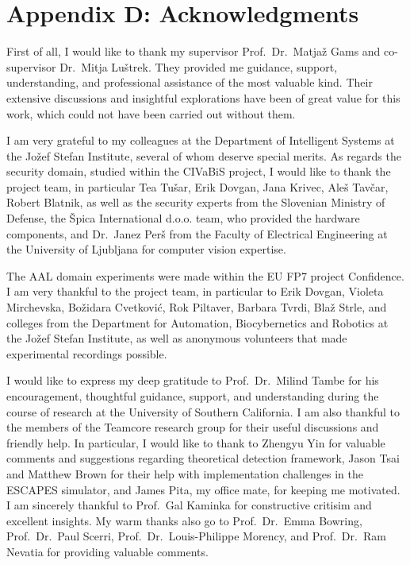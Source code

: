 
\chapter*{\vspace{-2.3cm} \Large Appendix D: Acknowledgments \vspace{1.7cm}}

\fancyhead[LO]{}


First of all, I would like to thank my supervisor Prof.\ Dr.\ Matja\v{z} Gams and co-supervisor Dr.\ Mitja Lu\v{s}trek. They provided me guidance, support, understanding, and professional assistance of the most valuable kind. Their extensive discussions and insightful explorations have been of great value for this work, which  could not have been carried out without them.

I am very grateful to my colleagues at the Department of Intelligent Systems at the Jo{\v z}ef Stefan Institute, several of whom deserve special merits. As regards the security domain, studied within the CIVaBiS project, I would like to thank the project team, in particular Tea Tu{\v s}ar, Erik Dovgan, Jana Krivec, Ale{\v s} Tav{\v c}ar, Robert Blatnik, as well as the security experts from the Slovenian Ministry of Defense, the {\v S}pica International d.o.o. team, who provided the hardware components, and Dr.\ Janez Per{\v s} from the Faculty of Electrical Engineering at the University of Ljubljana for computer vision expertise. 

The AAL domain experiments were made within the EU FP7 project Confidence. I am very thankful to the project team, in particular to Erik Dovgan, Violeta Mirchevska, Bo{\v z}idara Cvetkovi{\'c}, Rok Piltaver, Barbara Tvrdi, Bla{\v z} Strle, and colleges from the Department for Automation, Biocybernetics and Robotics at the Jo{\v z}ef Stefan Institute, as well as anonymous volunteers that made experimental recordings possible.   

I would like to express my deep gratitude to Prof.\ Dr.\ Milind Tambe for his encouragement, thoughtful guidance, support, and understanding during the course of research at the University of Southern California. I am also thankful to the members of the Teamcore research group for their useful discussions and friendly help. In particular, I would like to thank to Zhengyu Yin for valuable comments and suggestions regarding theoretical detection framework, Jason Tsai and Matthew Brown for their help with implementation challenges in the ESCAPES simulator, and James Pita, my office mate, for keeping me motivated. I am sincerely thankful to Prof.\ Gal Kaminka for constructive critisim and excellent insights. My warm thanks also go to Prof.\ Dr.\ Emma Bowring, Prof.\ Dr.\ Paul Scerri, Prof.\ Dr.\ Louis-Philippe Morency, and Prof.\ Dr.\ Ram Nevatia for providing valuable comments. 


